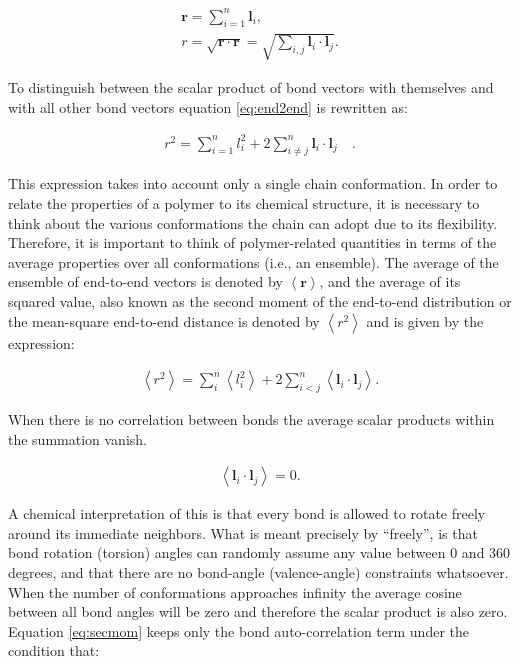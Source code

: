 \begin{gather}
\label{eq:e2e}
\mathbf{r} = \sum_{i=1}^{n} \mathbf{l}_{i} ,\\
\label{eq:end2end}
r = \sqrt{\mathbf{r} \cdot \mathbf{r}} 
  = \sqrt{\sum_{i,j}\mathbf{l}_{i} \cdot \mathbf{l}_{j}} .
\end{gather}

To  distinguish  between  the  scalar  product of  bond  vectors  with
themselves and  with all other bond  vectors equation \ref{eq:end2end}
is rewritten as:

\begin{gather}
r^2 = \sum_{i=1}^{n}l_{i}^{2} + 2 \sum_{i\neq j}^{n}
\mathbf{l}_{i} \cdot \mathbf{l}_{j} \quad.
\end{gather}  

This   expression   takes   into   account   only   a   single   chain
conformation. In  order to relate the  properties of a  polymer to its
chemical  structure,  it  is  necessary  to think  about  the  various
conformations the chain can  adopt due to its flexibility.  Therefore,
it is important to think of polymer-related quantities in terms of the
average  properties over  all conformations  (i.e., an  ensemble). The
average of  the ensemble of  end-to-end vectors is denoted  by $\left<
\mathbf{r} \right>$, and the average  of its squared value, also known
as the second moment of the end-to-end distribution or the mean-square
end-to-end distance is denoted by $\left< r^2 \right>$ and is given by
the expression:

\begin{gather}
\label{eq:secmom}  
\left<r^2\right>=\sum_{i}^{n}\left<l_{i}^2\right> +
2\sum_{i<j}^{n}\left<\mathbf{l}_{i} \cdot \mathbf{l}_{j}\right> .
\end{gather}  

When there is no correlation between bonds the average scalar products
within the summation vanish.

\begin{gather}
\label{eq:nocorr}
\left<\mathbf{l}_{i} \cdot \mathbf{l}_{j}\right> = 0 .
\end{gather}

A chemical  interpretation of  this is that  every bond is  allowed to
rotate freely around its immediate neighbors.  What is meant precisely
by  ``freely'', is that  bond rotation  (torsion) angles  can randomly
assume any  value between  0 and  360 degrees, and  that there  are no
bond-angle (valence-angle) constraints whatsoever.  When the number of
conformations approaches infinity the  average cosine between all bond
angles will  be zero  and therefore the  scalar product is  also zero.
Equation  \ref{eq:secmom} keeps  only the  bond  auto-correlation term
under the condition that:

